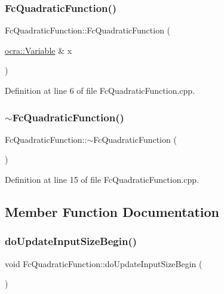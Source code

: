 \subsubsection{\texorpdfstring{Fc\+Quadratic\+Function()}{FcQuadraticFunction()}}
{\footnotesize\ttfamily Fc\+Quadratic\+Function\+::\+Fc\+Quadratic\+Function (\begin{DoxyParamCaption}\item[{\hyperlink{classocra_1_1Variable}{ocra\+::\+Variable} \&}]{x }\end{DoxyParamCaption})}



Definition at line 6 of file Fc\+Quadratic\+Function.\+cpp.

\hypertarget{classocra_1_1FcQuadraticFunction_a1eef85d7638d6bfc0c2bb3bc9dab8d63}{}\label{classocra_1_1FcQuadraticFunction_a1eef85d7638d6bfc0c2bb3bc9dab8d63} 
\subsubsection{\texorpdfstring{$\sim$\+Fc\+Quadratic\+Function()}{~FcQuadraticFunction()}}
{\footnotesize\ttfamily Fc\+Quadratic\+Function\+::$\sim$\+Fc\+Quadratic\+Function (\begin{DoxyParamCaption}{ }\end{DoxyParamCaption})\hspace{0.3cm}{\ttfamily [virtual]}}



Definition at line 15 of file Fc\+Quadratic\+Function.\+cpp.



\subsection{Member Function Documentation}
\hypertarget{classocra_1_1FcQuadraticFunction_a1e350f138eb82cfe3e8cf049942e626c}{}\label{classocra_1_1FcQuadraticFunction_a1e350f138eb82cfe3e8cf049942e626c} 
\subsubsection{\texorpdfstring{do\+Update\+Input\+Size\+Begin()}{doUpdateInputSizeBegin()}}
{\footnotesize\ttfamily void Fc\+Quadratic\+Function\+::do\+Update\+Input\+Size\+Begin (\begin{DoxyParamCaption}{ }\end{DoxyParamCaption})\hspace{0.3cm}{\ttfamily [virtual]}}

